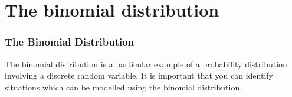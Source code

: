 \documentclass{beamer}
\begin{document}
\section{The binomial distribution} 


\begin{frame}
\frametitle{The Binomial Distribution}
The binomial distribution is a particular example of a probability distribution involving a discrete random variable. 
It is important that you can identify situations which can be modelled using the binomial distribution. 
\end{frame}
\end{document}
